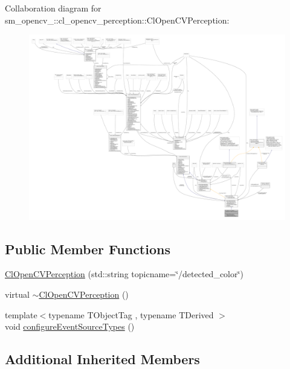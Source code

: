 Collaboration diagram for sm\+\_\+opencv\+\_\+:\+:cl\+\_\+opencv\+\_\+perception\+:\+:Cl\+Open\+C\+V\+Perception\+:
\nopagebreak
\begin{figure}[H]
\begin{center}
\leavevmode
\includegraphics[width=350pt]{classsm__opencv__2_1_1cl__opencv__perception_1_1ClOpenCVPerception__coll__graph}
\end{center}
\end{figure}
\subsection*{Public Member Functions}
\begin{DoxyCompactItemize}
\item 
\hyperlink{classsm__opencv__2_1_1cl__opencv__perception_1_1ClOpenCVPerception_a16f35df6947adb742fc3d144730639f3}{Cl\+Open\+C\+V\+Perception} (std\+::string topicname=\char`\"{}/detected\+\_\+color\char`\"{})
\item 
virtual \hyperlink{classsm__opencv__2_1_1cl__opencv__perception_1_1ClOpenCVPerception_ad079137946bc358a852ffd45041b09f0}{$\sim$\+Cl\+Open\+C\+V\+Perception} ()
\item 
{\footnotesize template$<$typename T\+Object\+Tag , typename T\+Derived $>$ }\\void \hyperlink{classsm__opencv__2_1_1cl__opencv__perception_1_1ClOpenCVPerception_a0e06cbeb7204986e2dbdc5772d749f8b}{configure\+Event\+Source\+Types} ()
\end{DoxyCompactItemize}
\subsection*{Additional Inherited Members}


